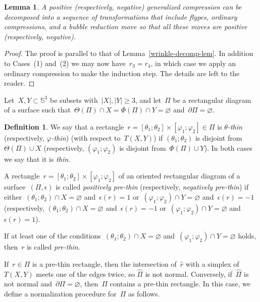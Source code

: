 \documentclass{amsart}
\theoremstyle{theorem}
\newtheorem{lemm}[theo]{Lemma}
\theoremstyle{remark}
\theoremstyle{definition}
\newtheorem{defi}[theo]{Definition}
\numberwithin{equation}{section}
\numberwithin{figure}{section}
\begin{document}
\begin{lemm}\label{gen-compres-decomp-lem}
A positive \emph(respectively, negative\emph) generalized compression can be decomposed
into a sequence of transformations
that include flypes, ordinary compressions, and a bubble reduction move so that all these moves are positive
\emph(respectively, negative\emph).
\end{lemm}

\begin{proof}
The proof is parallel to that of Lemma~\ref{wrinkle-decomp-lem}.
In addition to Cases~(1) and~(2) we may now have~$r_3=r_4$, in which case we apply
an ordinary compression to make the induction step. The details are left to the reader.
\end{proof}



Let~$X,Y\subset\mathbb S^3$ be subsets with~$|X|,|Y|\geqslant3$, and let~$\Pi$
be a rectangular diagram of a surface such that~$\Theta(\Pi)\cap X=\Phi(\Pi)\cap Y=\varnothing$
and~$\partial\Pi=\varnothing$.

\begin{defi}
We say that a rectangle~$r=[\theta_1;\theta_2]\times[\varphi_1;\varphi_2]\in\Pi$
is \emph{$\theta$-thin} (respectively, \emph{$\varphi$-thin}) (with respect to~$T(X,Y)$) if
$(\theta_1;\theta_2)$ is disjoint from~$\Theta(\Pi)\cup X$ (respectively,
$(\varphi_1;\varphi_2)$ is disjoint from~$\Phi(\Pi)\cup Y$).
In both cases we say that it is \emph{thin}.


A rectangle~$r=[\theta_1;\theta_2]\times[\varphi_1;\varphi_2]$ of an oriented
rectangular diagram of a surface~$(\Pi,\epsilon)$ is called \emph{positively pre-thin}
(respectively, \emph{negatively pre-thin}) if either~$(\theta_1;\theta_2)\cap X=\varnothing$ and~$\epsilon(r)=1$
or~$(\varphi_1;\varphi_2)\cap Y=\varnothing$ and~$\epsilon(r)=-1$
(respectively, $(\theta_1;\theta_2)\cap X=\varnothing$ and~$\epsilon(r)=-1$
or~$(\varphi_1;\varphi_2)\cap Y=\varnothing$ and~$\epsilon(r)=1$).

If at least one of the conditions~$(\theta_1;\theta_2)\cap X=\varnothing$
and~$(\varphi_1;\varphi_2)\cap Y=\varnothing$ holds, then~$r$ is called \emph{pre-thin}.
\end{defi}


If~$r\in\Pi$ is a pre-thin rectangle, then the intersection of~$\widehat r$ with a simplex of~$T(X,Y)$ meets
one of the edges twice, so $\widehat\Pi$ is not normal. Conversely, if~$\widehat\Pi$
is not normal and~$\partial\Pi=\varnothing$, then~$\Pi$ contains a pre-thin rectangle.
In this case, we define a normalization procedure for~$\Pi$
as follows.
\end{document}
